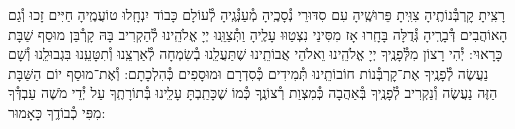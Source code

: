 \documentclass[twoside, openany, parskip=half, 11pt]{book}
\begin{document}
%
%
%
%
%
%



\sepline

\shabboskiddushhashem


רָצִֽיתָ קׇרְבְּ֯נוֹתֶֽיהָ צִוִּֽיתָ פֵּרוּשֶֽׁיהָ עִם סִדּוּרֵי נְ֯סָכֶֽיהָ מְ֯עַנְּ֯גֶֽיהָ לְ֯עוֹלָם כָּבוֹד יִנְחָֽלוּ טוֹעֲמֶֽיהָ חַיִּים זָכוּ וְ֯גַם הָאוֹהֲבִים דְּ֯בָרֶֽיהָ גְּ֯דֻלָּה בָּחָֽרוּ אָז מִסִּינַי נִצְטַוּוּ עָלֶֽיהָ
וַתְּ֯צַוֵּֽנוּ יְיָ אֱלֹהֵֽינוּ לְ֯הַקְרִיב בָּהּ קָרְ֯בַּן מוּסַף שַׁבָּת כָּרָאוּי: יְ֯הִי רָצוֹן מִלְּ֯פָנֶֽיךָ יְיָ אֱלֹהֵֽינוּ וֵאלֹהֵי אֲבוֹתֵֽינוּ שֶׁתַּעֲלֵֽנוּ בְ֯שִׂמְחָה לְ֯אַרְצֵֽנוּ וְ֯תִטָּעֵֽנוּ בִּגְבוּלֵֽנוּ וְ֯שָׁם נַעֲשֶׂה לְ֯פָנֶֽיךָ אֶת־קׇרְבְּ֯נוֹת חוֹבוֹתֵֽינוּ תְּ֯מִידִים כְּ֯סִדְרָם וּמוּסָפִים כְּ֯הִלְכָתָם: וְ֯אֶת־מוּסַף יוֹם הַשַּׁבָּת הַזֶּה נַעֲשֶׂה וְ֯נַקְרִיב לְ֯פָנֶֽיךָ בְּ֯אַהֲבָה כְּ֯מִצְוַת רְ֯צוֹנֶֽךָ כְּ֯מוֹ שֶׁכָּתַֽבְתָּ עָלֵֽינוּ בְּ֯תוֹרָתֶֽךָ עַל יְ֯דֵי מֹשֶׁה עַבְדְּ֯ךָ מִפִּי כְ֯בוֹדֶֽךָ כָּאָמוּר:
\end{document}
